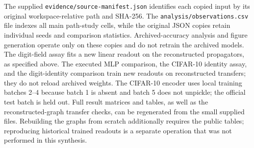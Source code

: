 \documentclass[10pt,letterpaper]{article}
\begin{document}
The supplied \texttt{evidence/source-manifest.json} identifies each copied
input by its original workspace-relative path and SHA-256. The
\texttt{analysis/observations.csv} file indexes all main path-study cells,
while the original JSON copies retain individual seeds and comparison
statistics. Archived-accuracy analysis and figure generation operate only on these copies
and do not retrain the archived models. The digit-field assay fits a new linear
readout on the reconstructed propagators, as specified above. The executed MLP
comparison, the CIFAR-10 identity assay, and the digit-identity comparison train new readouts on reconstructed
transfers; they do not reload archived weights. The CIFAR-10 encoder uses local training batches 2--4 because batch 1 is absent and batch 5 does not unpickle; the official test batch is held out. Full result matrices and tables, as well
as the reconstructed-graph transfer checks, can be regenerated from the
small supplied files. Rebuilding the graphs from scratch additionally
requires the public tables; reproducing historical trained readouts is
a separate operation that was not performed in this synthesis.
\end{document}

